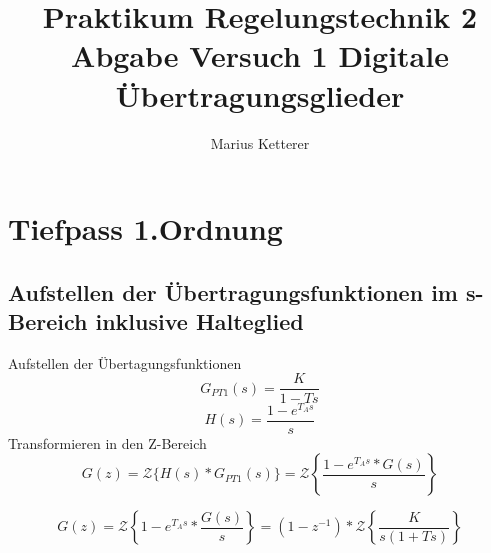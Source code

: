 \documentclass[12pt,a4paper]{report}
\author{Marius Ketterer}
\title{Praktikum Regelungstechnik 2 Abgabe Versuch 1 Digitale Übertragungsglieder}
\begin{document}
\maketitle
\tableofcontents

\chapter{Tiefpass 1.Ordnung}
\section{Aufstellen der Übertragungsfunktionen im s-Bereich inklusive Halteglied}
Aufstellen der Übertagungsfunktionen
\begin{equation}
G_{PT1}(s) = \frac{K}{1-Ts} 
\end{equation}
\begin{equation}
H(s) = \frac{1-e^{T_As}}{s}
\end{equation}
Transformieren in den Z-Bereich
\begin{equation}
G(z) = \mathcal{Z}\{H(s)*G_{PT1}(s)\} = \mathcal{Z}\left\{\frac{1-e^{T_As}* G(s)}{s}\right\}
\end{equation}

\begin{equation}
G(z) = \mathcal{Z}\left\{1-e^{T_As}*\frac{G(s)}{s}\right\} = (1-z^{-1})*\mathcal{Z}\left\{\frac{K}{s(1+Ts)}\right\}
\end{equation}
\end{document}
